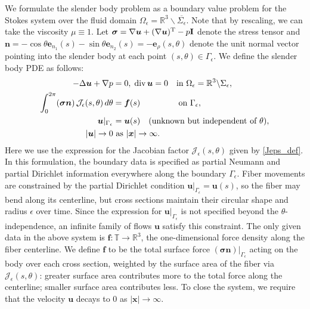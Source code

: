 \documentclass[11pt]{article}
\numberwithin{equation}{section}
\newcommand{\R}{\mathbb{R}}
\newcommand{\T}{\mathbb{T}}
\newcommand{\bu}{\bm{u}}
\newcommand{\bx}{\bm{x}}
\newcommand{\be}{\bm{e}}
\newcommand{\ts}{\thinspace}
\newcommand{\dive}{{\rm{div}}}
\newcommand{\abs}[1]{\left\lvert #1 \right\rvert}
\newcommand{\mc}[1]{\mathcal{#1}}
\theoremstyle{definition}
\begin{document}
We formulate the slender body problem as a boundary value problem for the Stokes system over the fluid domain $\Omega_{\epsilon}=\R^3\backslash \overline{\Sigma_{\epsilon}}$. Note that by rescaling, we can take the viscosity $\mu\equiv 1$. Let $\bm{\sigma}= \nabla \bu+(\nabla\bu)^{\rm T} -p{\bf I}$ denote the stress tensor and ${\bm n}=-\cos\theta\be_{n_1}(s)-\sin\theta\be_{n_2}(s)=-\be_{\rho}(s,\theta)$ denote the unit normal vector pointing into the slender body at each point $(s,\theta)\in \Gamma_{\epsilon}$. We define the slender body PDE as follows: 
\begin{equation}\label{exterior_stokes}
\begin{aligned}
-\Delta \bu +\nabla p &= 0, \; \dive \ts \bu = 0 \quad \text{in } \Omega_{\epsilon} = \R^3 \backslash \Sigma_{\epsilon}, \\
\int_0^{2\pi} (\bm{\sigma} {\bm n}) \ts \mathcal{J}_{\epsilon}(s,\theta) \ts d\theta &= {\bm f}(s) \hspace{1.5cm} \text{ on } \Gamma_{\epsilon}, \\
\bu|_{\Gamma_{\epsilon}} &= \bu(s) \quad \text{(unknown but independent of }\theta), \\
|\bu| \to 0 & \text{ as } |\bx|\to \infty.
\end{aligned}
\end{equation}
Here we use the expression for the Jacobian factor $\mathcal{J}_{\epsilon}(s,\theta)$ given by \eqref{Jeps_def}. In this formulation, the boundary data is specified as partial Neumann and partial Dirichlet information everywhere along the boundary $\Gamma_\epsilon$. Fiber movements are constrained by the partial Dirichlet condition $\bu\big|_{\Gamma_\epsilon}=\bu(s)$, so the fiber may bend along its centerline, but cross sections maintain their circular shape and radius $\epsilon$ over time. Since the expression for $\bu\big|_{\Gamma_\epsilon}$ is not specified beyond the $\theta$-independence, an infinite family of flows $\bu$ satisfy this constraint. The only given data in the above system is $\bm{f}:\T\to\R^3$, the one-dimensional force density along the fiber centerline. We define $\bm{f}$ to be the total surface force $(\bm{\sigma}\bm{n})\big|_{\Gamma_\epsilon}$ acting on the body over each cross section, weighted by the surface area of the fiber via $\mc{J}_\epsilon(s,\theta)$: greater surface area contributes more to the total force along the centerline; smaller surface area contributes less. To close the system, we require that the velocity $\bu$ decays to 0 as $\abs{\bx}\to\infty$.\\
\end{document}

